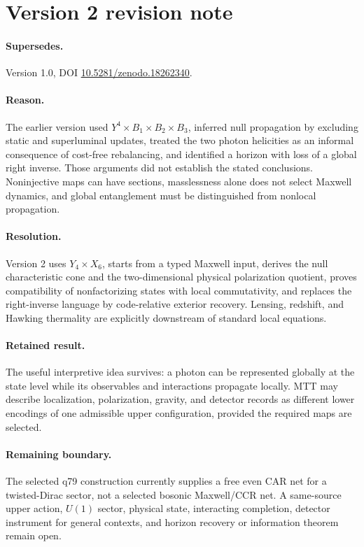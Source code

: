 \documentclass[11pt,a4paper]{article}
\numberwithin{equation}{section}
\theoremstyle{definition}
\theoremstyle{remark}
\begin{document}
\section*{Version 2 revision note}

\paragraph{Supersedes.} Version 1.0, DOI
\href{https://doi.org/10.5281/zenodo.18262340}{10.5281/zenodo.18262340}.

\paragraph{Reason.} The earlier version used
\(Y^4\times B_1\times B_2\times B_3\), inferred null propagation by
excluding static and superluminal updates, treated the two photon
helicities as an informal consequence of cost-free rebalancing, and
identified a horizon with loss of a global right inverse.  Those arguments
did not establish the stated conclusions.  Noninjective maps can have
sections, masslessness alone does not select Maxwell dynamics, and global
entanglement must be distinguished from nonlocal propagation.

\paragraph{Resolution.} Version 2 uses \(Y_4\times X_6\), starts from a
typed Maxwell input, derives the null characteristic cone and the
two-dimensional physical polarization quotient, proves compatibility of
nonfactorizing states with local commutativity, and replaces the
right-inverse language by code-relative exterior recovery.  Lensing,
redshift, and Hawking thermality are explicitly downstream of standard
local equations.

\paragraph{Retained result.} The useful interpretive idea survives:
a photon can be represented globally at the state level while its
observables and interactions propagate locally.  MTT may describe
localization, polarization, gravity, and detector records as different
lower encodings of one admissible upper configuration, provided the
required maps are selected.

\paragraph{Remaining boundary.} The selected q79 construction currently
supplies a free even CAR net for a twisted-Dirac sector, not a selected
bosonic Maxwell/CCR net.  A same-source upper action, \(U(1)\) sector,
physical state, interacting completion, detector instrument for general
contexts, and horizon recovery or information theorem remain open.
\end{document}
